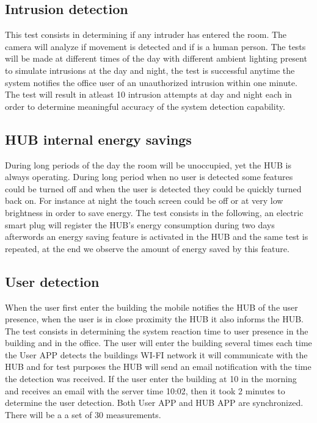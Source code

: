 \subsection{Intrusion detection}
This test consists in determining if any intruder has entered the room. The camera will analyze if movement is detected and if is a human person. The tests will be made at different times of the day with different ambient lighting present to simulate intrusions at the day and night, the test is successful anytime the system notifies the office user of an unauthorized intrusion within one minute.
The test will result in atleast 10 intrusion attempts at day and night each in order to determine meaningful accuracy of the system detection capability.


\subsection{HUB internal energy savings}
During long periods  of the day the room will be unoccupied, yet the HUB is always operating. During long period when no user is detected some features could be turned off and when the user is detected they could be quickly turned back on. For instance at night the touch screen could be off or at very low brightness in order to save energy. The test consists in the following, an electric smart plug will register the HUB's energy consumption during two days afterwords an energy saving feature is activated in the HUB and the same test is repeated, at the end we observe the amount of energy saved by this feature.

\subsection{User detection}
  When the user first enter the building the mobile notifies the HUB of the user presence, when the user is in close proximity the HUB it also informs the HUB.
The test consists in determining the system reaction time to user presence in the building and in the office. The user will enter the building several times each time the User APP detects the buildings WI-FI network it will communicate with the HUB and for test purposes the HUB will send an email notification with the time the detection was received. If the user enter the building at 10 in the morning and receives an email with the server time 10:02, then it took 2 minutes to determine the user detection. Both User APP and HUB APP are synchronized. There will be a a set of 30 measurements.